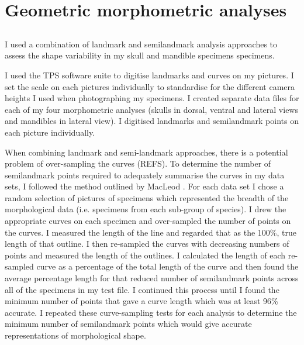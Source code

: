 \section{Geometric morphometric analyses}
\label{sect:morphometrics}

\subsection{}

	I used a combination of landmark and semilandmark analysis approaches to assess the shape variability in my skull and mandible specimens specimens. 

	I used the TPS software suite \citep{Rohlf2013} to digitise landmarks and curves on my pictures. I set the scale on each pictures individually to standardise for the different camera heights I used when photographing my specimens. I created separate data files for each of my four morphometric analyses (skulls in dorsal, ventral and lateral views and mandibles in lateral view). I digitised landmarks and semilandmark points on each picture individually.

	When combining landmark and semi-landmark approaches, there is a potential problem of over-sampling the curves (REFS). To determine the number of semilandmark points required to adequately summarise the curves in my data sets,  I followed the method outlined by MacLeod \citeyearpar{MacLeod2012}. For each data set I chose a random selection of pictures of specimens which represented the breadth of the morphological data (i.e. specimens from each sub-group of species). I drew the appropriate curves on each specimen and over-sampled the number of points on the curves. I measured the length of the line and regarded that as the 100\%, true length of that outline. I then re-sampled the curves with decreasing numbers of points and measured the length of the outlines. I calculated the length of each re-sampled curve as a percentage of the total length of the curve and then found the average percentage length for that reduced number of semilandmark points across all of the specimens in my test file. I continued this process until I found the minimum number of points that gave a curve length which was at least 96\% accurate.  I repeated these curve-sampling tests for each analysis to determine the minimum number of semilandmark points which would give accurate representations of morphological shape.
	
